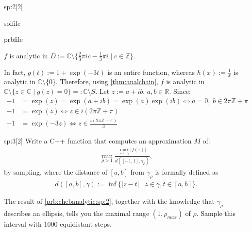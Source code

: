 \begin{samproblem}
\begin{subproblem}{sp:2}[2]
  \begin{samwriteprbpart}{solfile}
    \begin{writeverbatim}{prbfile}
      \begin{samsolution}
        $f$ is analytic in $D := \mathbb{C} \setminus \{ \frac{2}{3} \pi i c - \frac{1}{3} \pi i \; | \; c \in \mathbb{Z} \}$.

        In fact, $g(t) := 1 + \exp(-3t)$ is an entire function, whereas $h(x) := \frac{1}{x}$ is analytic in $\mathbb{C} \setminus \{ 0 \}$. 
        Therefore, using \cref{thm:analchain}, $f$ is analytic in $\mathbb{C} \setminus \{ z \in \mathbb{C} \; | \; g(z) = 0 \} =: \mathbb{C} \setminus S$. 
        Let $z := a + ib$, $a,b \in \mathbb{R}$. Since:
        \begin{align}
          -1 &= \exp(z) = \exp(a + ib) = \exp(a) \exp(ib) \Leftrightarrow a = 0,\; b \in 2 \pi \mathbb{Z} + \pi \\
          -1 &= \exp(z) \Leftrightarrow z \in i(2 \pi  \mathbb{Z} + \pi) \\
          -1 &= \exp(-3z) \Leftrightarrow z \in \frac{i(2 \pi \mathbb{Z} - \pi)}{3}
        \end{align}
      \end{samsolution}
    \end{writeverbatim}
  \end{samwriteprbpart}

\end{subproblem}


\begin{subproblem}{sp:3}[2]
  Write a C++ function that computes an approximation $M$ of:
  \begin{align}
    \min_{\rho > 1} \frac{ \max_{z \in \gamma_\rho} \lvert f(z) \rvert }{d([-1,1], \gamma_\rho)},
  \end{align}
  by sampling, where the distance of $[a,b]$ from $\gamma_{\rho}$ is formally defined as
  \begin{align}
    d([a,b], \gamma) := \inf \{ \lvert z - t \rvert \; | \; z \in \gamma, t \in [a,b] \}.
  \end{align}

  \begin{samhint}
    The result of \ref{prb:chebanalytic:sp:2}, together with the knowledge that $\gamma_\rho$ describes an ellipsis, tells you the maximal range 
    $(1,\rho_{max})$ of $\rho$. Sample this interval with $1000$ equidistant steps.
  \end{samhint}
 

\end{subproblem}
\end{samproblem}
